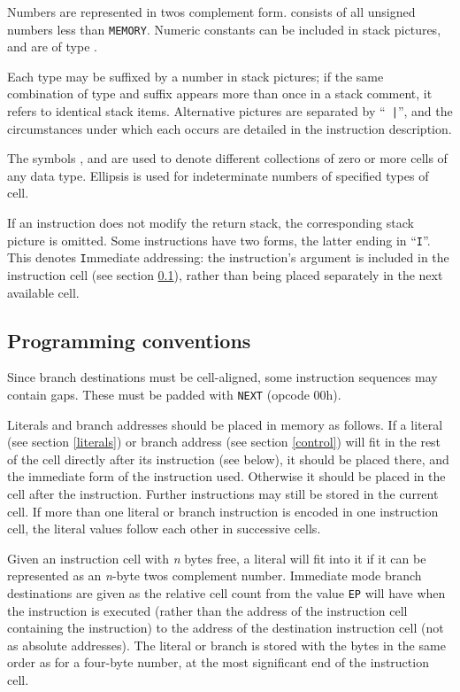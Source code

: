 Numbers are represented in twos complement form.  consists of all
unsigned numbers less than {\tt MEMORY}. Numeric constants can be included in
stack pictures, and are of type .

Each type may be suffixed by a number in stack pictures; if the same combination
of type and suffix appears more than once in a stack comment, it refers to
identical stack items. Alternative  pictures are separated by ``{\tt
|}'', and the circumstances under which each occurs are detailed in the
instruction description.

The symbols ,  and  are used to denote different
collections of zero or more cells of any data type. Ellipsis is used for
indeterminate numbers of specified types of cell.

If an instruction does not modify the return stack, the corresponding stack
picture is omitted. Some instructions have two forms, the latter ending in
``{\tt I}''. This denotes {\tt I}mmediate addressing: the instruction's argument
is included in the instruction cell (see section \ref{conventions}), rather than
being placed separately in the next available cell.


\subsection{Programming conventions}
\label{conventions}

Since branch destinations must be cell-aligned, some instruction sequences may
contain gaps. These must be padded with {\tt NEXT} (opcode 00h).

Literals and branch addresses should be placed in memory as follows. If a
literal (see section \ref{literals}) or branch address (see section
\ref{control}) will fit in the rest of the cell directly after its instruction
(see below), it should be placed there, and the immediate form of the
instruction used. Otherwise it should be placed in the cell after the
instruction. Further instructions may still be stored in the current cell. If
more than one literal or branch instruction is encoded in one instruction cell,
the literal values follow each other in successive cells.

Given an instruction cell with \textit{n} bytes free, a literal will fit into
it if it can be represented as an \textit{n}-byte twos complement number.
Immediate mode branch destinations are given as the relative cell count from
the value {\tt EP} will have when the instruction is executed (rather than the
address of the instruction cell containing the instruction) to the address of
the destination instruction cell (not as absolute addresses). The literal or
branch is stored with the bytes in the same order as for a four-byte number, at
the most significant end of the instruction cell.


